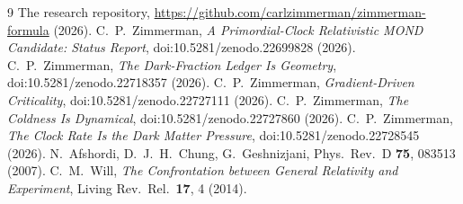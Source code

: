 \documentclass[11pt,letterpaper]{article}
\begin{document}
\begin{thebibliography}{9}
 The research repository, \url{https://github.com/carlzimmerman/zimmerman-formula} (2026).
 C.~P.~Zimmerman, \emph{A Primordial-Clock Relativistic MOND Candidate: Status Report}, doi:10.5281/zenodo.22699828 (2026).
 C.~P.~Zimmerman, \emph{The Dark-Fraction Ledger Is Geometry}, doi:10.5281/zenodo.22718357 (2026).
 C.~P.~Zimmerman, \emph{Gradient-Driven Criticality}, doi:10.5281/zenodo.22727111 (2026).
 C.~P.~Zimmerman, \emph{The Coldness Is Dynamical}, doi:10.5281/zenodo.22727860 (2026).
 C.~P.~Zimmerman, \emph{The Clock Rate Is the Dark Matter Pressure}, doi:10.5281/zenodo.22728545 (2026).
 N.~Afshordi, D.~J.~H.~Chung, G.~Geshnizjani, Phys.\ Rev.\ D \textbf{75}, 083513 (2007).
 C.~M.~Will, \emph{The Confrontation between General Relativity and Experiment}, Living Rev.\ Rel.\ \textbf{17}, 4 (2014).
\end{thebibliography}
\end{document}
